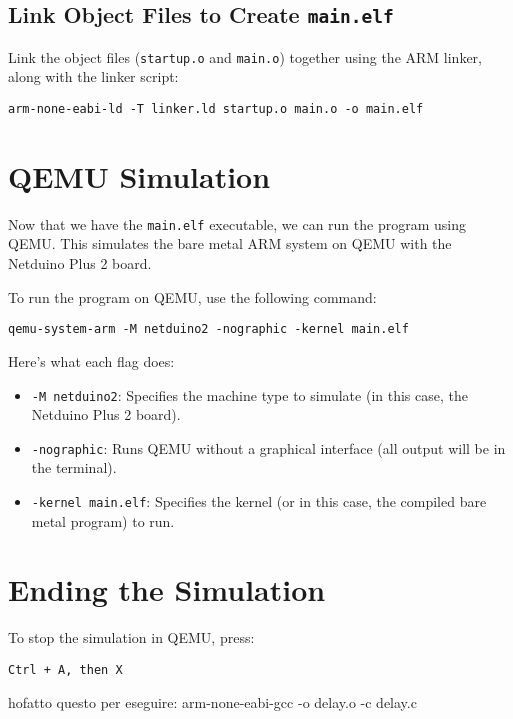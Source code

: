 \subsection*{Link Object Files to Create \texttt{main.elf}}

Link the object files (\texttt{startup.o} and \texttt{main.o}) together using the ARM linker, along with the linker script:

\begin{lstlisting}
arm-none-eabi-ld -T linker.ld startup.o main.o -o main.elf
\end{lstlisting}

\section*{QEMU Simulation}

Now that we have the \texttt{main.elf} executable, we can run the program using QEMU. This simulates the bare metal ARM system on QEMU with the Netduino Plus 2 board.

To run the program on QEMU, use the following command:

\begin{lstlisting}
qemu-system-arm -M netduino2 -nographic -kernel main.elf
\end{lstlisting}

Here’s what each flag does:
\begin{itemize}
    \item \texttt{-M netduino2}: Specifies the machine type to simulate (in this case, the Netduino Plus 2 board).
    \item \texttt{-nographic}: Runs QEMU without a graphical interface (all output will be in the terminal).
    \item \texttt{-kernel main.elf}: Specifies the kernel (or in this case, the compiled bare metal program) to run.
\end{itemize}

\section*{Ending the Simulation}

To stop the simulation in QEMU, press:

\begin{lstlisting}
Ctrl + A, then X
\end{lstlisting}


hofatto questo per eseguire: arm-none-eabi-gcc -o delay.o -c delay.c



